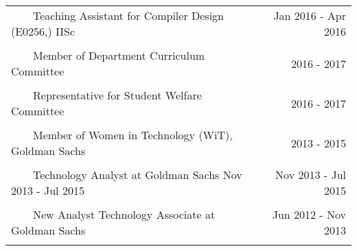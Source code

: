 \documentclass[a4paper,10pt]{article} %
\newcommand{\tabitem}{~~\llap{\textbullet}~~}
\begin{document}
\begin{tabular}{lr}
\tabitem Teaching Assistant for Compiler Design (E0256,) IISc  & Jan 2016 - Apr 2016 \\
&\\
\tabitem Member of Department Curriculum Committee &  2016 - 2017\\
&\\
\tabitem Representative for Student Welfare Committee  & 2016 - 2017\\
&\\
\tabitem Member of Women in Technology (WiT), Goldman Sachs  & 2013 - 2015\\
&\\
\tabitem Technology Analyst at Goldman Sachs Nov 2013 - Jul 2015 & Nov 2013 - Jul 2015 \\
&\\
\tabitem New Analyst Technology Associate at Goldman Sachs & Jun 2012 - Nov 2013 \\
&\\
\end{tabular}

\end{document}
